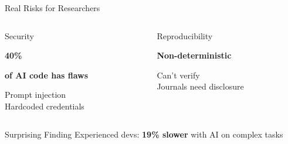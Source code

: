 \documentclass[aspectratio=169]{beamer}
\begin{document}
\begin{frame}{Real Risks for Researchers}
  \begin{columns}[T]
    \begin{column}{0.48\textwidth}
      \begin{alertblock}{Security \cite{security2025ai}}
        \centering

        {\LARGE\bfseries\textcolor{conesaOrange}{40\%}}

        \vspace{0.3cm}
        \normalsize
        \textbf{of AI code has flaws}

        \vspace{0.3cm}
        Prompt injection\\
        Hardcoded credentials
      \end{alertblock}
    \end{column}
    \begin{column}{0.48\textwidth}
      \begin{alertblock}{Reproducibility}
        \centering

        \large\bfseries
        Non-deterministic

        \vspace{0.3cm}
        \normalsize
        Can't verify\\
        Journals need disclosure
      \end{alertblock}
    \end{column}
  \end{columns}

  \vspace{0.5cm}

  \begin{block}{Surprising Finding \cite{metr2025study}}
    \centering
    Experienced devs: {\large\bfseries\textcolor{conesaOrange}{19\% slower}} with AI on complex tasks
  \end{block}
\end{frame}
\end{document}
